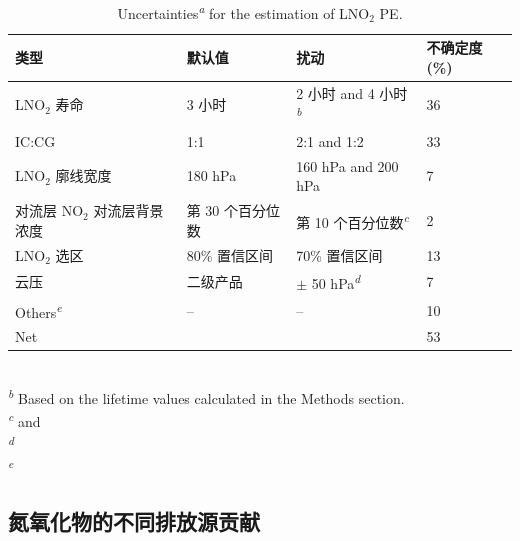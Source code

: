 \begin{table}[!htbp]
\centering
\caption{Uncertainties\textsuperscript{\emph{a}} for the estimation of LNO$_2$ PE.}
\label{table:arctic_uncertainty}
\begin{tabular}{llll}
\hline
类型                           &  默认值        & 扰动                 &   不确定度 (\%)  \\
\hline
LNO$_2$ 寿命                   & 3 小时                 & 2 小时 and 4 小时\textsuperscript{\emph{b}}      &   36                      \\
IC:CG                         & 1:1                    & 2:1 and 1:2                  &   33 \\
LNO$_2$ 廓线宽度                & 180 hPa               & 160 hPa and 200 hPa          &   7   \\
对流层 NO$_2$ 对流层背景浓度      & 第 30 个百分位数        & 第 10 个百分位数\textsuperscript{\emph{c}}     & 2                \\
LNO$_2$ 选区              & 80\% 置信区间          &  70\% 置信区间   & 13                \\
云压                 & 二级产品               &  $\pm$ 50 hPa\textsuperscript{\emph{d}}                & 7                \\
Others\textsuperscript{\emph{e}}       & --                  & --                           &   10                      \\
Net                            &                     &                              &   53                      \\
\hline
\end{tabular}
\footnotesize
{}\\
\textsuperscript{\emph{b}} Based on the lifetime values calculated in the Methods section. \\
\textsuperscript{\emph{c}} \citet{Allen.2021a} and \citet{Perez-Invernon.2022}  \\
\textsuperscript{\emph{d}} \citet{VanGeffen.2022} \\
\textsuperscript{\emph{e}} \citet{Allen.2021a}
\end{table}


\subsection{氮氧化物的不同排放源贡献}


